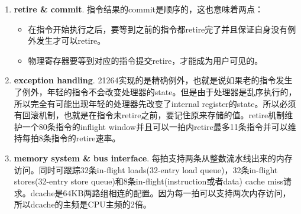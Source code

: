 \documentclass{article}
\newenvironment{commentary}
{ \vspace{-0.1in}
  \begin{quotation}
  \noindent
  \small \em
  \rule{\linewidth}{1pt}\\
}
{
  \end{quotation}
}
\begin{document}
\begin{multicols}{2}
\begin{enumerate}
		\item \textbf{retire \& commit}. 指令结果的commit是顺序的，这也意味着两点：
		\begin{itemize}
			\item 在指令开始执行之后，要等到之前的指令都retire完了并且保证自身没有例外发生才可以retire。
			\item 物理寄存器要等到对应的指令提交retire，才能成为用户可见的。
		\end{itemize}
		\item \textbf{exception handling}. 21264实现的是精确例外，也就是说如果老的指令发生了例外，年轻的指令不会改变处理器的state。但是由于处理器是乱序执行的，所以完全有可能出现年轻的处理器先改变了internal register的state。所以必须有回滚机制，也就是在指令未retire之前，要记住原来存储的值。retire机制维护一个80条指令的inflight window并且可以一拍内retire最多11条指令并可以维持每拍8条指令的retire速率。
		\item \textbf{memory system \& bus interface}.
		每拍支持两条从整数流水线出来的内存访问。同时可跟踪32条in-flight loads(32-entry load queue)，32条in-flight stores(32-entry store queue)和8条in-flight(instruction或者data) cache miss请求。dcache是64KB两路组相连的配置。因为每一拍可以支持两次内存访问，所以dcache的主频是CPU主频的2倍。~\cite{alpha}
		

\end{enumerate}
\end{multicols}
\end{document}
